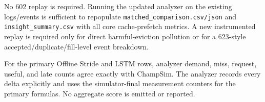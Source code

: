 \documentclass[10pt]{article}
\begin{document}
\begin{infobox}[title={\bfseries Analyze/replay decision}]
No 602 replay is required.  Running the updated analyzer on the existing
logs/events is sufficient to repopulate
\texttt{matched\_comparison.csv/json} and
\texttt{insight\_summary.csv} with all core cache-prefetch metrics.
A new instrumented replay is required only for direct harmful-eviction
pollution or for a 623-style accepted/duplicate/fill-level event breakdown.
\end{infobox}

{\footnotesize For the primary Offline Stride and LSTM rows, analyzer demand,
miss, request, useful, and late counts agree exactly with ChampSim.  The
analyzer records every delta explicitly and uses the simulator-final
measurement counters for the primary formulas.  No aggregate score is emitted
or reported.}
\end{document}
